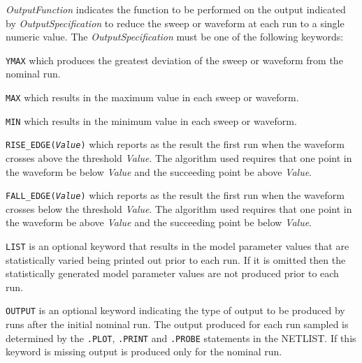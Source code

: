 \begin{widelist}
\item[{\it OutputFunction}] indicates the function to be performed on the
     output indicated by {\it OutputSpecification} to reduce the sweep
     or waveform at each run to a single numeric value.
     {
     The {\it OutputSpecification} must be one of the following keywords:}
     \begin{widelist}
     \item[{\tt YMAX}] which produces the greatest deviation of the sweep or
                       waveform from the nominal run.

     {
     \item[{\tt MAX}] which results in the maximum value in each sweep or
                      waveform.

     \item[{\tt MIN}] which results in the minimum value in each sweep or
                      waveform.

     \item[{\tt RISE\_EDGE({\it Value})}] which reports as the result the
                      first run when the waveform crosses above the threshold
              {\it Value}.
              The algorithm used requires that
              one point in the waveform be below {\it Value}
              and the succeeding point be above {\it Value}.

     \item[{\tt FALL\_EDGE({\it Value})}] which reports as the result the
                      first run when the waveform crosses below the threshold
              {\it Value}.
              The algorithm used requires that
              one point in the waveform be above {\it Value}
              and the succeeding point be below {\it Value}.
     }
     \end{widelist}


\item[{\tt LIST}] is an optional keyword that results in the model parameter
                  values that are statistically varied
                  being printed out prior to each run. If it is omitted
          then the statistically generated model parameter
          values are not produced prior to each run.


\item[{\tt OUTPUT}] is an optional keyword indicating the type of output to
                  be produced by runs after the initial nominal run. The
          output produced for each run sampled is determined by the
          {\tt .PLOT}, {\tt .PRINT} and {\tt .PROBE} statements in
          the NETLIST. If this keyword is missing output is produced
          only for the nominal run.

\end{widelist}

